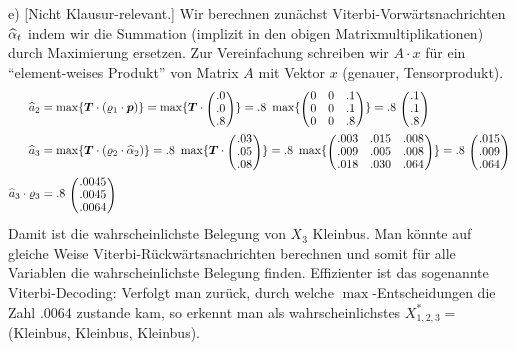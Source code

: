 \begin{solution}
e) [Nicht Klausur-relevant.] Wir berechnen zunächst
Viterbi-Vorwärtsnachrichten $\widehat{\alpha}_t$ indem wir die Summation (implizit in den
obigen Matrixmultiplikationen) durch Maximierung ersetzen. Zur
Vereinfachung schreiben wir $A\cdot x$ für ein ``element-weises
Produkt'' von Matrix $A$ mit Vektor $x$ (genauer, Tensorprodukt).
\begin{align}
\hat a_2
&= \max\{ \vec T\cdot (\r_1 \cdot \vec p) \} 
 = \max\{ \vec T\cdot \mat{c}{.0 \\ .0 \\ .8 } \} 
 = .8~ \max\{ \mat{ccc}{
0 & 0 & .1 \\
0 & 0 & .1 \\
0 & 0 & .8 } \} = .8~ \mat{c}{ .1 \\ .1 \\ .8 } \\
\hat a_3
&= \max\{ \vec T\cdot (\r_2 \cdot \hat\a_2) \} 
 = .8~ \max\{ \vec T\cdot \mat{c}{.03 \\ .05 \\ .08 } \} 
 = .8~ \max\{ \mat{ccc}{
.003 & .015 & .008 \\
.009 & .005 & .008 \\
.018 & .030 & .064 } \} = .8~ \mat{c}{ .015 \\ .009 \\ .064 } \\
\hat a_3 \cdot \r_3
&= .8~ \mat{c}{ .0045 \\ .0045 \\ .0064 }
\end{align}
Damit ist die wahrscheinlichste Belegung von $X_3$ Kleinbus. Man
könnte auf gleiche Weise Viterbi-Rückwärtsnachrichten berechnen und
somit für alle Variablen die wahrscheinlichste Belegung
finden. Effizienter ist das sogenannte Viterbi-Decoding: Verfolgt
man zurück, durch welche $\max$-Entscheidungen die Zahl $.0064$
zustande kam, so erkennt man als wahrscheinlichstes $X_{1,2,3}^*=$
(Kleinbus, Kleinbus, Kleinbus).

\end{solution}

\exerfoot
